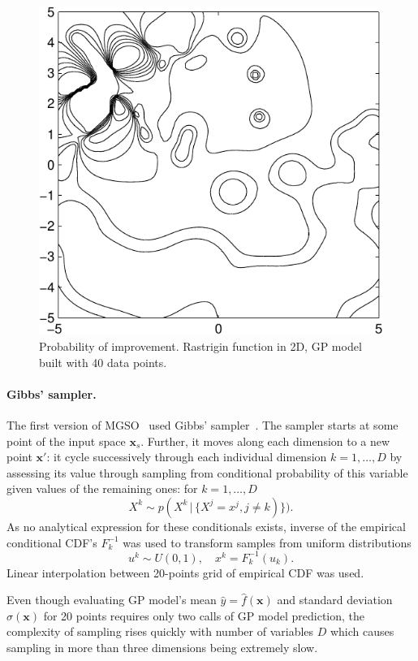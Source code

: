 \documentclass{itatnew}
\newcommand{\xx}{\mathrm{\mathbf{x}}}
\begin{document}
\begin{figure}
  \centering
  \includegraphics[width=0.6\linewidth]{poi_example}
  {\small
  \caption{Probability of improvement. Rastrigin function in 2D, GP model built with 40 data points.
  \label{fig:poi}
  }
  }
\end{figure}

\paragraph{Gibbs' sampler.}

The first version of MGSO~\cite{bajer_model_2013} used Gibbs' sampler~\cite{geman_stochastic_1984}. The sampler starts at some point of the input space $\xx_s$. Further, it moves along each dimension to a new point $\xx'$: it cycle successively through each individual dimension $k = 1,\ldots,D$ by assessing its value through sampling from conditional probability of this variable given values of the remaining ones: for $k=1,\ldots,D$
\begin{equation}
X^k \sim p(X^k \, | \, \{X^j = x^j, j \neq k)\}).
\end{equation}
As no analytical expression for these conditionals exists, inverse of the empirical conditional CDF's $F^{-1}_k$ was used to transform samples from uniform distributions
\begin{displaymath}
u^k \sim U(0,1), \quad  x^k = F^{-1}_k(u_k).
\end{displaymath}
Linear interpolation between 20-points grid of empirical CDF was used.

Even though evaluating GP model's mean $\hat{y} = \hat{f}(\xx)$ and standard deviation $\hat{\sigma}(\xx)$ for 20 points requires only two calls of GP model prediction, the complexity of sampling rises quickly with number of variables $D$ which causes sampling in more than three dimensions being extremely slow.
\end{document}
